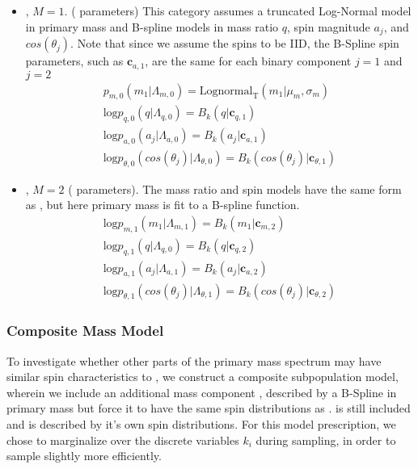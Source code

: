 \begin{itemize}
    \item \first{}, $M=1$. ( parameters) This category assumes a truncated Log-Normal model in primary mass and B-spline models in mass ratio $q$, spin magnitude $a_j$, and $cos(\theta_j)$. Note that since we assume the spins to be IID, the B-Spline spin parameters, such as $\mathbf{c}_{a,1}$, are the same for each binary component $j=1$ and $j=2$
    \begin{eqnarray} \label{eq:lowmass}
        p_{m,0}(m_1| \Lambda_{m,0}) = \text{Lognormal}_\text{T}(m_1 | \mu_{m}, \sigma_{m}) \\
        \text{log} p_{q,0}(q| \Lambda_{q,0}) = B_k(q | \mathbf{c}_{q,1}) \\
        \text{log} p_{a,0}(a_j| \Lambda_{a,0}) = B_k(a_j | \mathbf{c}_{a,1}) \\
        \text{log} p_{\theta,0}(cos(\theta_j)| \Lambda_{\theta,0}) = B_k( cos(\theta_j) | \mathbf{c}_{\theta,1})
    \end{eqnarray}

    \item \contB{}, $M=2$ ( parameters). The mass ratio and spin models have the same form as \first{}, but here primary mass is fit to a B-spline function. 
    \begin{eqnarray} \label{eq:contmass}
        \text{log} p_{m,1}(m_1| \Lambda_{m,1}) = B_k(m_1 | \mathbf{c}_{m, 2}) \\
        \text{log} p_{q,1}(q| \Lambda_{q,0}) = B_k(q | \mathbf{c}_{q,2}) \\
        \text{log} p_{a,1}(a_j| \Lambda_{a,1}) = B_k(a_j | \mathbf{c}_{a,2}) \\
        \text{log} p_{\theta,1}(cos(\theta_j)| \Lambda_{\theta,1}) = B_k( cos(\theta_j) | \mathbf{c}_{\theta,2})
    \end{eqnarray}
    
\end{itemize}

\subsubsection{Composite Mass Model}

To investigate whether other parts of the primary mass spectrum may have similar spin characteristics to \first{}, we construct a composite subpopulation model, wherein we include an additional mass component \contA{}, described by a B-Spline in primary mass but force it to have the same spin distributions as \first{}. \contB is still included and is described by it's own spin distributions. For this model prescription, we chose to marginalize over the discrete variables $k_i$ during sampling, in order to sample slightly more efficiently. 

